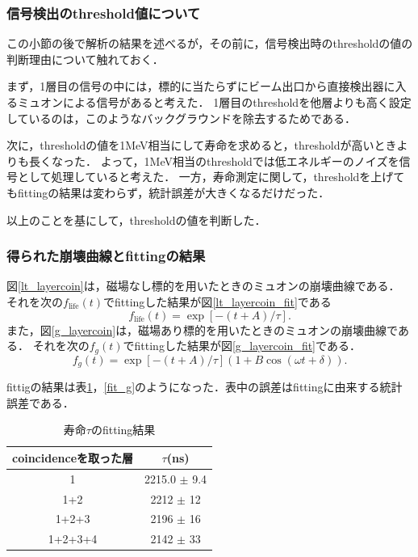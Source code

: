 \subsubsection{信号検出のthreshold値について}
この小節の後で解析の結果を述べるが，その前に，信号検出時のthresholdの値の判断理由について触れておく．

まず，1層目の信号の中には，標的に当たらずにビーム出口から直接検出器に入るミュオンによる信号があると考えた．
1層目のthresholdを他層よりも高く設定しているのは，このようなバックグラウンドを除去するためである．

次に，thresholdの値を1MeV相当にして寿命を求めると，thresholdが高いときよりも長くなった．
よって，1MeV相当のthresholdでは低エネルギーのノイズを信号として処理していると考えた．
一方，寿命測定に関して，thresholdを上げてもfittingの結果は変わらず，統計誤差が大きくなるだけだった．

以上のことを基にして，thresholdの値を判断した．

\subsubsection{得られた崩壊曲線とfittingの結果}
図\ref{lt_layercoin}は，磁場なし標的を用いたときのミュオンの崩壊曲線である．
それを次の$f_{\mathrm{life}}(t)$でfittingした結果が図\ref{lt_layercoin_fit}である
\begin{equation*}
f_{\mathrm{life}}(t) = \exp[-(t+A)/\tau].
\end{equation*}
また，図\ref{g_layercoin}は，磁場あり標的を用いたときのミュオンの崩壊曲線である．
それを次の$f_{g}(t)$でfittingした結果が図\ref{g_layercoin_fit}である．
\begin{equation*}
f_{g}(t) = \exp[-(t+A)/\tau](1+B\cos(\omega t + \delta)).
\end{equation*}

fittigの結果は表\ref{fit_lt}，\ref{fit_g}のようになった．表中の誤差はfittingに由来する統計誤差である．

\begin{table}[H]
\caption{寿命$\tau$のfitting結果}
\label{fit_lt}
\begin{center}
\begin{tabular}{cc}\toprule
coincidenceを取った層 	& $\tau$(ns) \\ \midrule
1 			& 2215.0 $\pm$ 9.4 \\
1+2 			& 2212 $\pm$ 12 \\
1+2+3 			& 2196 $\pm$ 16 \\
1+2+3+4 		& 2142 $\pm$ 33 \\ \bottomrule
\end{tabular}
\end{center}
\end{table}%

